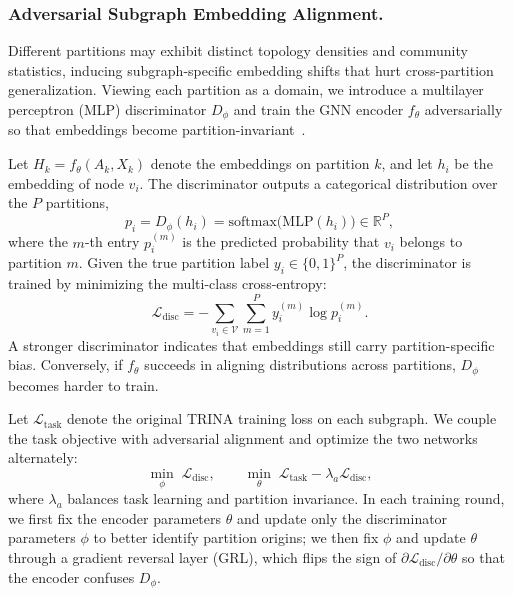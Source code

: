 \documentclass[sigconf, anonymous, review]{acmart}
\begin{document}
    \subsubsection{Adversarial Subgraph Embedding Alignment.}
      Different partitions may exhibit distinct topology densities and community statistics, inducing subgraph-specific embedding shifts that hurt cross-partition generalization. Viewing each partition as a domain, we introduce a multilayer perceptron (MLP) discriminator $D_{\phi}$ and train the GNN encoder $f_{\theta}$ adversarially so that embeddings become partition-invariant~\cite{ganin2015unsupervised}.

      Let $H_k=f_{\theta}(A_k,X_k)$ denote the embeddings on partition $k$, and let $h_i$ be the embedding of node $v_i$. The discriminator outputs a categorical distribution over the $P$ partitions,
      \begin{equation}
        p_i = D_{\phi}(h_i) = \mathrm{softmax}\bigl(\mathrm{MLP}(h_i)\bigr) \in \mathbb{R}^{P},
      \end{equation}
      where the $m$-th entry $p_i^{(m)}$ is the predicted probability that $v_i$ belongs to partition $m$. Given the true partition label $y_i\in\{0,1\}^{P}$, the discriminator is trained by minimizing the multi-class cross-entropy:
      \begin{equation}
        \mathcal{L}_{\text{disc}} = - \sum_{v_i \in \mathcal{V}} \sum_{m=1}^{P} y_i^{(m)} \log p_i^{(m)}.
      \end{equation}
      A stronger discriminator indicates that embeddings still carry partition-specific bias. Conversely, if $f_{\theta}$ succeeds in aligning distributions across partitions, $D_{\phi}$ becomes harder to train.

      Let $\mathcal{L}_{\text{task}}$ denote the original TRINA training loss on each subgraph. We couple the task objective with adversarial alignment and optimize the two networks alternately:
      \begin{equation}
        \min_{\phi}\; \mathcal{L}_{\text{disc}},
        \qquad
        \min_{\theta}\; \mathcal{L}_{\text{task}} - \lambda_a \mathcal{L}_{\text{disc}},
      \end{equation}
      where $\lambda_a$ balances task learning and partition invariance. In each training round, we first fix the encoder parameters $\theta$ and update only the discriminator parameters $\phi$ to better identify partition origins; we then fix $\phi$ and update $\theta$ through a gradient reversal layer (GRL), which flips the sign of $\partial \mathcal{L}_{\text{disc}}/\partial \theta$ so that the encoder confuses $D_{\phi}$.
\end{document}
